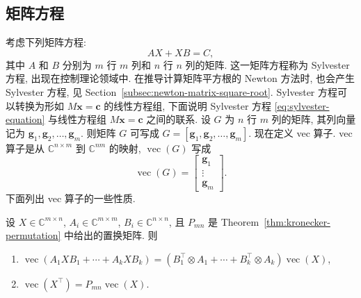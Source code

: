 \subsection{{矩阵方程}}\label{sec:matrix-equations}
{考虑下列矩阵方程:}
\begin{equation}\label{eq:sylvester-equation}
AX+XB=C,
\end{equation}
{其中 $A$ 和 $B$ 分别为 $m$ 行 $m$ 列和 $n$ 行 $n$ 列的矩阵. 这一矩阵方程称为 Sylvester 方程, 出现在控制理论领域中. 在推导计算矩阵平方根的 Newton 方法时, 也会产生 Sylvester 方程, 见 Section\ \ref{subsec:newton-matrix-square-root}.}
{Sylvester 方程可以转换为形如 $M\boldsymbol{x}=\boldsymbol{c}$ 的线性方程组, 下面说明 Sylvester 方程 \eqref{eq:sylvester-equation} 与线性方程组 $M\boldsymbol{x}=\boldsymbol{c}$ 之间的联系.}
{设 $G$ 为 $n$ 行 $m$ 列的矩阵, 其列向量记为 $\boldsymbol{g}_1,\boldsymbol{g}_2,\ldots,\boldsymbol{g}_m$. 则矩阵 $G$ 可写成 $G=[\boldsymbol{g}_1,\boldsymbol{g}_2,\ldots,\boldsymbol{g}_m]$. 现在定义 vec 算子. vec 算子是从 $\mathbb{C}^{n\times m}$ 到 $\mathbb{C}^{nm}$ 的映射, $\operatorname{vec}(G)$ 写成}
\begin{equation}\label{eq:vectorization-definition}
\operatorname{vec}(G)=\begin{bmatrix}\boldsymbol{g}_1\\\vdots\\\boldsymbol{g}_m\end{bmatrix}.
\end{equation}
{下面列出 vec 算子的一些性质.}
\begin{Theorem}\label{thm:vectorization-properties}
{设 $X\in\mathbb{C}^{m\times n}$, $A_i\in\mathbb{C}^{m\times m}$, $B_i\in\mathbb{C}^{n\times n}$, 且 $P_{mn}$ 是 Theorem\ \ref{thm:kronecker-permutation} 中给出的置换矩阵. 则}
\begin{enumerate}
\item $\operatorname{vec}(A_1XB_1+\cdots+A_kXB_k)=(B_1^{\top}\otimes A_1+\cdots+B_k^{\top}\otimes A_k)\operatorname{vec}(X)$,
\item $\operatorname{vec}(X^{\top})=P_{mn}\operatorname{vec}(X)$.
\end{enumerate}
\end{Theorem}

